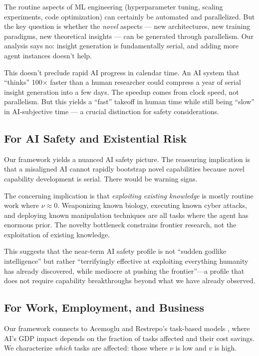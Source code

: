 \documentclass[11pt,a4paper]{article}
\begin{document}
The routine aspects of ML engineering (hyperparameter tuning, scaling experiments, code optimization) can certainly be automated and parallelized. But the key question is whether the \emph{novel} aspects --- new architectures, new training paradigms, new theoretical insights --- can be generated through parallelism. Our analysis says no: insight generation is fundamentally serial, and adding more agent instances doesn't help.

This doesn't preclude rapid AI progress in calendar time. An AI system that ``thinks'' 100$\times$ faster than a human researcher could compress a year of serial insight generation into a few days. The speedup comes from clock speed, not parallelism. But this yields a ``fast'' takeoff in human time while still being ``slow'' in AI-subjective time --- a crucial distinction for safety considerations.

\subsection{For AI Safety and Existential Risk}

Our framework yields a nuanced AI safety picture. The reassuring implication is that a misaligned AI cannot rapidly bootstrap novel capabilities because novel capability development is serial. There would be warning signs.

The concerning implication is that \emph{exploiting existing knowledge} is mostly routine work where $\nu \approx 0$. Weaponizing known biology, executing known cyber attacks, and deploying known manipulation techniques are all tasks where the agent has enormous prior. The novelty bottleneck constrains frontier research, not the exploitation of existing knowledge.

This suggests that the near-term AI safety profile is not ``sudden godlike intelligence'' but rather ``terrifyingly effective at exploiting everything humanity has already discovered, while mediocre at pushing the frontier''---a profile that does not require capability breakthroughs beyond what we have already observed.

\subsection{For Work, Employment, and Business}

Our framework connects to Acemoglu and Restrepo's task-based models \citep{acemoglu2024}, where AI's GDP impact depends on the fraction of tasks affected and their cost savings. We characterize \emph{which} tasks are affected: those where $\nu$ is low and $v$ is high.
\end{document}
